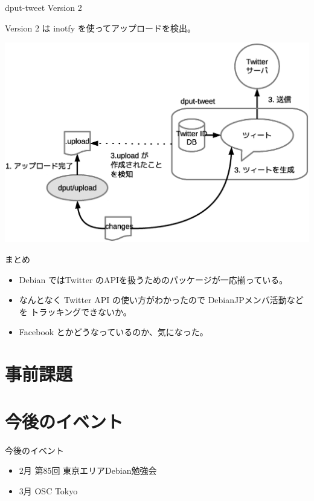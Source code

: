 \begin{frame}{dput-tweet Version 2}

Version 2 は inotfy を使ってアップロードを検出。
\begin{center}
\includegraphics[width=1.0\hsize]{image201201/debianmeeting201201-imagedata-v2.eps}
\end{center}

\end{frame}

\begin{frame}{まとめ}
\begin{itemize}
\item Debian ではTwitter のAPIを扱うためのパッケージが一応揃っている。
\item なんとなく Twitter API の使い方がわかったので DebianJPメンバ活動などを
トラッキングできないか。
\item Facebook とかどうなっているのか、気になった。
\
\end{itemize}
\end{frame}






\section{事前課題}
{\footnotesize

}

\section{今後のイベント}
\begin{frame}{今後のイベント}
 
\begin{itemize}
 \item 2月 第85回 東京エリアDebian勉強会
 \item 3月 OSC Tokyo
\end{itemize}
\end{frame}

